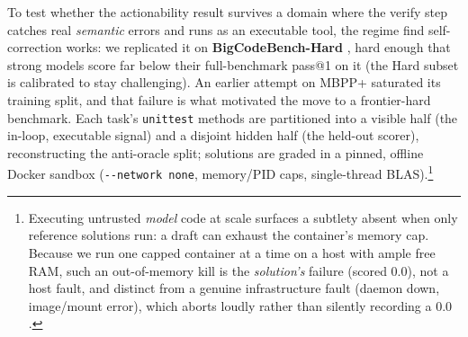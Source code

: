 \documentclass[11pt]{article}
\begin{document}
To test whether the actionability result survives a domain where the verify step catches real
\emph{semantic} errors and runs as an executable tool, the regime
\citet{shinn2023reflexion} find self-correction works: we replicated it on
\textbf{BigCodeBench-Hard} \citep{zhuo2024bigcodebench}, hard
enough that strong models score far below their full-benchmark pass@1 on it (the Hard
subset is calibrated to stay challenging). An earlier attempt on MBPP+
\citep{liu2023evalplus} saturated its training split, and that failure is what motivated
the move to a frontier-hard benchmark. Each task's \texttt{unittest} methods are partitioned into a visible half
(the in-loop, executable signal) and a disjoint hidden half (the held-out scorer),
reconstructing the anti-oracle split; solutions are graded in a pinned, offline Docker
sandbox (\texttt{-{}-network none}, memory/PID caps, single-thread BLAS).\footnote{Executing
untrusted \emph{model} code at scale surfaces a subtlety absent when only reference solutions
run: a draft can exhaust the container's memory cap. Because we run one capped container at a
time on a host with ample free RAM, such an out-of-memory kill is the \emph{solution's} failure
(scored $0.0$), not a host fault, and distinct from a genuine infrastructure fault (daemon down,
image/mount error), which aborts loudly rather than silently recording a $0.0$.}
\end{document}
